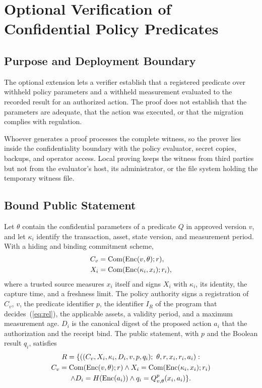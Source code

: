 \section{Optional Verification of Confidential Policy Predicates}
\label{sec:zk}

\subsection{Purpose and Deployment Boundary}
\label{sec:zkboundary}
The optional extension lets a verifier establish that a registered predicate over withheld policy parameters and a withheld measurement evaluated to the recorded result for an authorized action. The proof does not establish that the parameters are adequate, that the action was executed, or that the migration complies with regulation.

Whoever generates a proof processes the complete witness, so the prover lies inside the confidentiality boundary with the policy evaluator, secret copies, backups, and operator access. Local proving keeps the witness from third parties but not from the evaluator's host, its administrator, or the file system holding the temporary witness file.

\subsection{Bound Public Statement}
Let $\theta$ contain the confidential parameters of a predicate $Q$ in approved version $v$, and let $\kappa_i$ identify the transaction, asset, state version, and measurement period. With a hiding and binding commitment scheme,
\begin{align}
C_v &= \mathrm{Com}(\mathrm{Enc}(v,\theta); r), \label{eq:cv}\\
X_i &= \mathrm{Com}(\mathrm{Enc}(\kappa_i, x_i); r_i), \label{eq:xi}
\end{align}
where a trusted source measures $x_i$ itself and signs $X_i$ with $\kappa_i$, its identity, the capture time, and a freshness limit. The policy authority signs a registration of $C_v$, $v$, the predicate identifier $p$, the identifier $I_R$ of the program that decides~(\ref{eq:rel}), the applicable assets, a validity period, and a maximum measurement age. $D_i$ is the canonical digest of the proposed action $a_i$ that the authorization and the receipt bind. The public statement, with $p$ and the Boolean result $q_i$, satisfies
\begin{multline}
\label{eq:rel}
R = \{ ((C_v, X_i, \kappa_i, D_i, v, p, q_i);\ \theta, r, x_i, r_i, a_i) : \\
C_v = \mathrm{Com}(\mathrm{Enc}(v,\theta); r) \wedge X_i = \mathrm{Com}(\mathrm{Enc}(\kappa_i,x_i); r_i) \\
\wedge D_i = H(\mathrm{Enc}(a_i)) \wedge q_i = Q^{p}_{v,\theta}(x_i, a_i) \}.
\end{multline}

